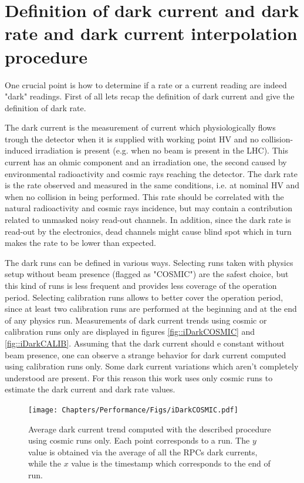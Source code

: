 \section{Definition of dark current and dark rate and dark current interpolation procedure}
One crucial point is how to determine if a rate or a current reading are indeed "dark" readings.
First of all lets recap the definition of dark current and give the definition of dark rate.

The dark current is the measurement of current which physiologically flows trough the detector when it is supplied with working point HV and no collision-induced irradiation is present (e.g. when no beam is present in the LHC).
This current has an ohmic component and an irradiation one, the second caused by environmental radioactivity and cosmic rays reaching the detector.
The dark rate is the rate observed and measured in the same conditions, i.e. at nominal HV and when no collision in being performed.
This rate should be correlated with the natural radioactivity and cosmic rays incidence, but may contain a contribution related to unmasked noisy read-out channels.
In addition, since the dark rate is read-out by the electronics, dead channels might cause blind spot which in turn makes the rate to be lower than expected.

The dark runs can be defined in various ways.
Selecting runs taken with physics setup without beam presence (flagged as "COSMIC") are the safest choice, but this kind of runs is less frequent and provides less coverage of the operation period.
Selecting calibration runs allows to better cover the operation period, since at least two calibration runs are performed at the beginning and at the end of any physics run.
Measurements of dark current trends using cosmic or calibration runs only are displayed in figures \ref{fig::iDarkCOSMIC} and \ref{fig::iDarkCALIB}.
Assuming that the dark current should e constant without beam presence, one can observe a strange behavior for dark current computed using calibration runs only.
Some dark current variations which aren't completely understood are present.
For this reason this work uses only cosmic runs to estimate the dark current and dark rate values.

\begin{figure}[!t]
\begin{center}
\texttt{[image: Chapters/Performance/Figs/iDarkCOSMIC.pdf]}
\caption{Average dark current trend computed with the described procedure using cosmic runs only. Each point corresponds to a run. The $y$ value is obtained via the average of all the RPCs dark currents, while the $x$ value is the timestamp which corresponds to the end of run.}
\label{fig:iDarkCOSMIC}
\end{center}
\end{figure}

